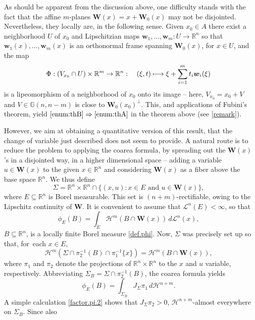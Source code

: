 \documentclass[JEP,XML,SOM,Unicode,ThmDefs,NoEqCountersInSection]{cedram}
\newcommand\mto{\mathchoice{\longmapsto}{\mapsto}{\mapsto}{\mapsto}}
\newcommand{\R}{\mathbb{R}}
\newcommand{\Rm}{\R^m}
\newcommand{\Rn}{\R^n}
\newcommand{\calH}{\mathscr{H}}
\newcommand{\calL}{\mathscr{L}}
\newcommand{\bW}{{\boldsymbol{W}}}
\newcommand{\bw}{{\boldsymbol{w}}}
\newcommand{\bG}{\mathbb{G}}
\let\subset\subseteq
\begin{document}
As should be apparent from the discussion above, one difficulty stands with the fact that the affine $m$-planes $\bW(x) = x + \bW_0(x)$ may not be disjointed.
Nevertheless, they locally are, in the following sense.
Given $x_0 \in A$ there exist a neighborhood $U$ of $x_0$ and Lipschitzian maps $\bw_1,\ldots,\bw_m: U \to \Rn$ so that $\bw_1(x),\ldots,\bw_m(x)$ is an orthonormal frame spanning $\bW_0(x)$, for $x \in U$, and the map
\[
\Phi: (V_{x_0} \cap U) \times \Rm \to \Rn:\quad (\xi,t) \mto \xi + \sum_{i=1}^m t_i \bw_i(\xi)
\]
is a lipeomorphism of a neighborhood of $x_0$ onto its image -- here, $V_{x_0} = x_0 + V$ and $V \in \bG(n,n-m)$ is close to $\bW_0(x_0)^\perp$.
This, and applications of Fubini's theorem, yield $\eqref{enum:thB} \Rightarrow \eqref{enum:thA}$ in the theorem above (see \ref{remark}).
\par
However, we aim at obtaining a quantitative version of this result, that the change of variable just described does not seem to provide.
A natural route is to reduce the problem to applying the coarea formula, by spreading out the $\bW(x)$'s in a disjointed way, in a higher dimensional space -- \ie adding a variable $u \in \bW(x)$ to the given $x \in \Rn$ and considering $\bW(x)$ as a fiber above the base space $\Rn$.
We thus define
\begin{equation*}
\Sigma = \Rn \times \Rn \cap \{ (x,u): x \in E \text{ and } u \in \bW(x) \},
\end{equation*}
where $E \subset \Rn$ is Borel measurable.
This set is $(n+m)$-rectifiable, owing to the Lipschitz continuity of $\bW$.
It is convenient to assume that $\calL^n(E) < \infty$, so that
\begin{equation}
\label{eq.01}
\phi_E(B) = \int_E \calH^m(B \cap \bW(x)) \,d\calL^n(x),
\end{equation}
$B \subset \Rn$, is a locally finite Borel measure \ref{def.phi}.
Now, $\Sigma$ was precisely set up so that, for~each $x \in E$,
\begin{equation*}
\calH^m(\Sigma \cap \pi_2^{-1}(B) \cap \pi_1^{-1}\{x\}) = \calH^m(B \cap \bW(x)),
\end{equation*}
where $\pi_1$ and $\pi_2$ denote the projections of $\Rn \times \Rn$ to the $x$ and $u$ variable, respectively.
Abbreviating $\Sigma_B = \Sigma \cap \pi_2^{-1}(B)$, the coarea formula yields
\begin{equation}
\label{eq.02}
\phi_E(B) = \int_{\Sigma_B} J_\Sigma \pi_1 \,d\calH^{n+m}.
\end{equation}
A simple calculation \ref{factor.pi.2} shows that $J_\Sigma \pi_2 > 0$, $\calH^{n+m}$-almost everywhere on $\Sigma_B$. Since also
\end{document}
